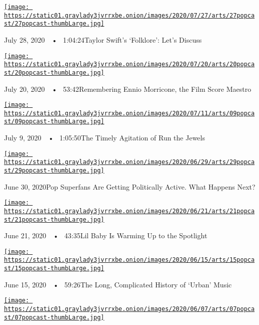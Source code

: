 \href{https://www.nytimes3xbfgragh.onion/2020/07/27/arts/music/popcast-taylor-swift-folklore.html?action=click\&module=audio-series-bar\&region=header\&pgtype=Article}{\texttt{[image: https://static01.graylady3jvrrxbe.onion/images/2020/07/27/arts/27popcast/27popcast-thumbLarge.jpg]}}

July 28, 2020~~•~ 1:04:24Taylor Swift's `Folklore': Let's Discuss

\href{https://www.nytimes3xbfgragh.onion/2020/07/20/arts/music/popcast-ennio-morricone.html?action=click\&module=audio-series-bar\&region=header\&pgtype=Article}{\texttt{[image: https://static01.graylady3jvrrxbe.onion/images/2020/07/20/arts/20popcast/20popcast-thumbLarge.jpg]}}

July 20, 2020~~•~ 53:42Remembering Ennio Morricone, the Film Score
Maestro

\href{https://www.nytimes3xbfgragh.onion/2020/07/09/arts/music/popcast-run-the-jewels.html?action=click\&module=audio-series-bar\&region=header\&pgtype=Article}{\texttt{[image: https://static01.graylady3jvrrxbe.onion/images/2020/07/11/arts/09popcast/09popcast-thumbLarge.jpg]}}

July 9, 2020~~•~ 1:05:50The Timely Agitation of Run the Jewels

\href{https://www.nytimes3xbfgragh.onion/2020/06/30/arts/music/popcast-superfans-politics.html?action=click\&module=audio-series-bar\&region=header\&pgtype=Article}{\texttt{[image: https://static01.graylady3jvrrxbe.onion/images/2020/06/29/arts/29popcast/29popcast-thumbLarge.jpg]}}

June 30, 2020Pop Superfans Are Getting Politically Active. What Happens
Next?

\href{https://www.nytimes3xbfgragh.onion/2020/06/21/arts/music/popcast-lil-baby.html?action=click\&module=audio-series-bar\&region=header\&pgtype=Article}{\texttt{[image: https://static01.graylady3jvrrxbe.onion/images/2020/06/21/arts/21popcast/21popcast-thumbLarge.jpg]}}

June 21, 2020~~•~ 43:35Lil Baby Is Warming Up to the Spotlight

\href{https://www.nytimes3xbfgragh.onion/2020/06/15/arts/music/popcast-urban-music.html?action=click\&module=audio-series-bar\&region=header\&pgtype=Article}{\texttt{[image: https://static01.graylady3jvrrxbe.onion/images/2020/06/15/arts/15popcast/15popcast-thumbLarge.jpg]}}

June 15, 2020~~•~ 59:26The Long, Complicated History of `Urban' Music

\href{https://www.nytimes3xbfgragh.onion/2020/06/07/arts/music/popcast-the-source-rodney-king.html?action=click\&module=audio-series-bar\&region=header\&pgtype=Article}{\texttt{[image: https://static01.graylady3jvrrxbe.onion/images/2020/06/07/arts/07popcast/07popcast-thumbLarge.jpg]}}

